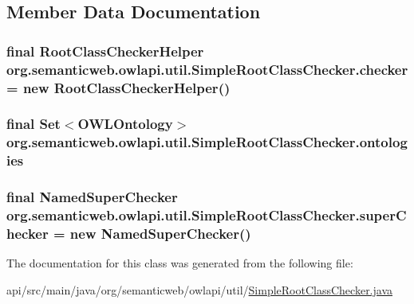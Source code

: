 \subsection{Member Data Documentation}
\hypertarget{classorg_1_1semanticweb_1_1owlapi_1_1util_1_1_simple_root_class_checker_ad35f6ebc0e0d650db76b7973de7f54c3}{
\subsubsection[{checker}]{\setlength{\rightskip}{0pt plus 5cm}final {\bf Root\-Class\-Checker\-Helper} org.\-semanticweb.\-owlapi.\-util.\-Simple\-Root\-Class\-Checker.\-checker = new {\bf Root\-Class\-Checker\-Helper}()\hspace{0.3cm}{\ttfamily [private]}}}\label{classorg_1_1semanticweb_1_1owlapi_1_1util_1_1_simple_root_class_checker_ad35f6ebc0e0d650db76b7973de7f54c3}
\hypertarget{classorg_1_1semanticweb_1_1owlapi_1_1util_1_1_simple_root_class_checker_a220778209cc9cf5b4aa5a4a303ae79ed}{
\subsubsection[{ontologies}]{\setlength{\rightskip}{0pt plus 5cm}final Set$<${\bf O\-W\-L\-Ontology}$>$ org.\-semanticweb.\-owlapi.\-util.\-Simple\-Root\-Class\-Checker.\-ontologies\hspace{0.3cm}{\ttfamily [private]}}}\label{classorg_1_1semanticweb_1_1owlapi_1_1util_1_1_simple_root_class_checker_a220778209cc9cf5b4aa5a4a303ae79ed}
\hypertarget{classorg_1_1semanticweb_1_1owlapi_1_1util_1_1_simple_root_class_checker_aa6d56d1c63621aa3c7746e2edb5b03af}{
\subsubsection[{super\-Checker}]{\setlength{\rightskip}{0pt plus 5cm}final Named\-Super\-Checker org.\-semanticweb.\-owlapi.\-util.\-Simple\-Root\-Class\-Checker.\-super\-Checker = new Named\-Super\-Checker()\hspace{0.3cm}{\ttfamily [protected]}}}\label{classorg_1_1semanticweb_1_1owlapi_1_1util_1_1_simple_root_class_checker_aa6d56d1c63621aa3c7746e2edb5b03af}


The documentation for this class was generated from the following file\-:\begin{DoxyCompactItemize}
\item 
api/src/main/java/org/semanticweb/owlapi/util/\hyperlink{_simple_root_class_checker_8java}{Simple\-Root\-Class\-Checker.\-java}\end{DoxyCompactItemize}
